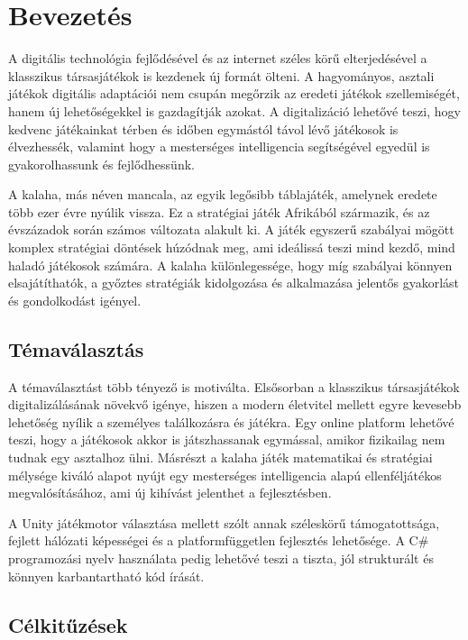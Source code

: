 \chapter{Bevezetés}
\label{ch:intro}

A digitális technológia fejlődésével és az internet széles körű elterjedésével a klasszikus társasjátékok is kezdenek új formát ölteni. A hagyományos, asztali játékok digitális adaptációi nem csupán megőrzik az eredeti játékok szellemiségét, hanem új lehetőségekkel is gazdagítják azokat. A digitalizáció lehetővé teszi, hogy kedvenc játékainkat térben és időben egymástól távol lévő játékosok is élvezhessék, valamint hogy a mesterséges intelligencia segítségével egyedül is gyakorolhassunk és fejlődhessünk.

A kalaha, más néven mancala, az egyik legősibb táblajáték, amelynek eredete több ezer évre nyúlik vissza. Ez a stratégiai játék Afrikából származik, és az évszázadok során számos változata alakult ki. A játék egyszerű szabályai mögött komplex stratégiai döntések húzódnak meg, ami ideálissá teszi mind kezdő, mind haladó játékosok számára. A kalaha különlegessége, hogy míg szabályai könnyen elsajátíthatók, a győztes stratégiák kidolgozása és alkalmazása jelentős gyakorlást és gondolkodást igényel.

\section{Témaválasztás}

A témaválasztást több tényező is motiválta. Elsősorban a klasszikus társasjátékok digitalizálásának növekvő igénye, hiszen a modern életvitel mellett egyre kevesebb lehetőség nyílik a személyes találkozásra és játékra. Egy online platform lehetővé teszi, hogy a játékosok akkor is játszhassanak egymással, amikor fizikailag nem tudnak egy asztalhoz ülni. Másrészt a kalaha játék matematikai és stratégiai mélysége kiváló alapot nyújt egy mesterséges intelligencia alapú ellenféljátékos megvalósításához, ami új kihívást jelenthet a fejlesztésben.

A Unity játékmotor választása mellett szólt annak széleskörű támogatottsága, fejlett hálózati képességei és a platformfüggetlen fejlesztés lehetősége. A C\# programozási nyelv használata pedig lehetővé teszi a tiszta, jól strukturált és könnyen karbantartható kód írását.

\section{Célkitűzések}

